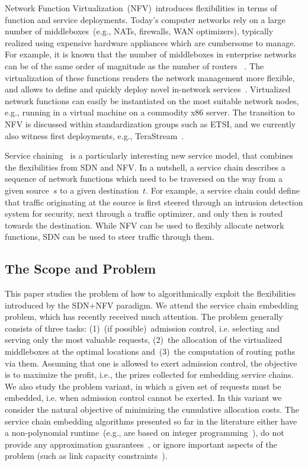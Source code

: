 \documentclass[10pt, conference, letterpaper]{IEEEtran}
\begin{document}
Network Function Virtualization~(NFV)~introduces flexibilities in terms
of function and service deployments. Today's computer networks 
rely on a large number of middleboxes~(e.g., NATs, firewalls, WAN optimizers),
typically realized using expensive hardware appliances which are cumbersome to manage.
For example, it is known that the number of middleboxes in enterprise 
networks can be of the same order of magnitude as the number
of routers ~\cite{someone}.
The virtualization of these functions renders the network management
more flexible, and allows to define and quickly deploy novel in-network services~\cite{routebricks,opennf,sosr15,modeling-middleboxes,clickos}.
Virtualized network functions can easily be instantiated 
on the most suitable
network nodes, e.g., running in a virtual machine
on a commodity x86 server.
The transition to NFV is discussed
within standardization groups such as ETSI, and we currently also
witness first
deployments, e.g., TeraStream~\cite{terastream}.

Service chaining~\cite{ewsdn14,stefano-sigc,merlin} is a particularly interesting new service model,
that combines the flexibilities from SDN and NFV.
In a nutshell, a service chain describes a sequence of
network functions which need to be traversed on the way
from a given source~$s$ to a given destination~$t$. 
For example, a service chain could define that
 traffic originating at the source is first steered through
an intrusion detection system
for security,
next through a traffic optimizer,
and only then is routed towards the destination.
While NFV can be used to flexibly allocate network functions,
SDN can be used to steer traffic through them.

\subsection{The Scope and Problem} 

This paper studies the problem of how to algorithmically exploit the flexibilities 
introduced by the SDN+NFV paradigm. 
We attend the service chain embedding problem, which has recently
received much attention. The problem generally consists of three tasks:
(1)~(if possible)~admission control, i.e. selecting and serving
only the most valuable requests,
(2)~the allocation of the virtualized
middleboxes at the optimal locations 
and~(3)~the computation of routing paths via them. 
Assuming that one is allowed to exert admission control, the objective is to maximize the profit, i.e., the prizes collected for embedding service chains. We also study the problem variant, in which a given set of requests must be embedded, i.e. when admission control cannot be exerted. In this variant we consider the natural objective of minimizing the cumulative allocation costs.
The service chain embedding algorithms presented
so far in the literature either have a
non-polynomial runtime~(e.g., are based on integer programming~\cite{mehraghdam2014specifying,stefano-sigc,merlin}),
do not provide any approximation guarantees~\cite{karl-chains},
or ignore important aspects of the problem (such as 
link capacity constraints~\cite{sirocco15}). 
\end{document}
